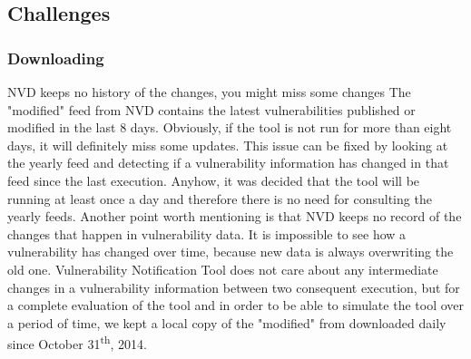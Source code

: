 \subsection{Challenges}
\subsubsection{Downloading}
NVD keeps no history of the changes, you might miss some changes
The "modified" feed from NVD contains the latest vulnerabilities published or modified in the last 8 days. Obviously, if the tool is not run for more than eight days, it will definitely miss some updates. This issue can be fixed by looking at the yearly feed and detecting if a vulnerability information has changed in that feed since the last execution. Anyhow, it was decided that the tool will be running at least once a day and therefore there is no need for consulting the yearly feeds. 
Another point worth mentioning is that NVD keeps no record of the changes that happen in vulnerability data. It is impossible to see how a vulnerability has changed over time, because new data is always overwriting the old one. Vulnerability Notification Tool does not care about any intermediate changes in a vulnerability information between two consequent execution, but for a complete evaluation of the tool and in order to be able to simulate the tool over a period of time, we kept a local copy of the "modified" from downloaded daily since October 31\textsuperscript{th}, 2014. 
